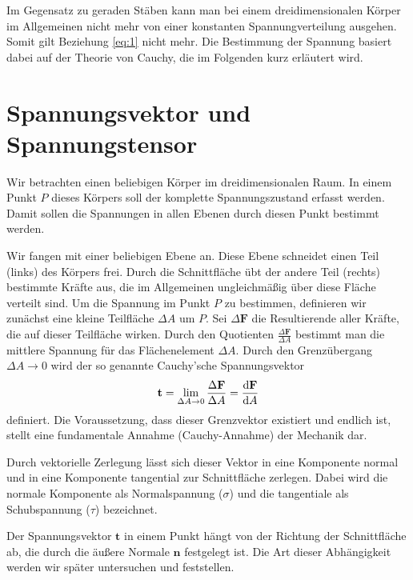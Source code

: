 \documentclass{lecture}
\begin{document}
    Im Gegensatz zu geraden Stäben kann man bei einem dreidimensionalen Körper im Allgemeinen nicht mehr von einer konstanten Spannungverteilung ausgehen.
    Somit gilt Beziehung \eqref{eq:1} nicht mehr.
    Die Bestimmung der Spannung basiert dabei auf der Theorie von Cauchy, die im Folgenden kurz erläutert wird.


    \section*{Spannungsvektor und Spannungstensor}

    Wir betrachten einen beliebigen Körper im dreidimensionalen Raum.
    In einem Punkt \(P\) dieses Körpers soll der komplette Spannungszustand erfasst werden.
    Damit sollen die Spannungen in allen Ebenen durch diesen Punkt bestimmt werden.


    Wir fangen mit einer beliebigen Ebene an.
    Diese Ebene schneidet einen Teil (links) des Körpers frei.
    Durch die Schnittfläche übt der andere Teil (rechts) bestimmte Kräfte aus, die im Allgemeinen ungleichmäßig über diese Fläche verteilt sind.
    Um die Spannung im Punkt \(P\) zu bestimmen, definieren wir zunächst eine kleine Teilfläche \(\Delta A\) um \(P\).
    Sei \(\Delta\mathbf{F}\) die Resultierende aller Kräfte, die auf dieser Teilfläche wirken.
    Durch den Quotienten \(\frac{\Delta\mathbf{F}}{\Delta A}\) bestimmt man die mittlere Spannung für das Flächenelement \(\Delta A\).
    Durch den Grenzübergang \(\Delta A \to 0\) wird der so genannte Cauchy'sche Spannungsvektor
    \begin{equation}\label{eq:2}
        \mathbf{t} = \lim_{\Delta A \to 0}\frac{\Delta\mathbf{F}}{\Delta A} = \frac{\mathop{\mathrm{d}\!}\mathbf{F}}{\mathop{\mathrm{d}\!} A}
    \end{equation}
    definiert.
    Die Voraussetzung, dass dieser Grenzvektor existiert und endlich ist, stellt eine fundamentale Annahme (Cauchy-Annahme) der Mechanik dar.

    Durch vektorielle Zerlegung lässt sich dieser Vektor in eine Komponente normal und in eine Komponente tangential zur Schnittfläche zerlegen.
    Dabei wird die normale Komponente als Normalspannung (\(\sigma\)) und die tangentiale als Schubspannung (\(\tau\)) bezeichnet.

    Der Spannungsvektor \(\mathbf{t}\) in einem Punkt hängt von der Richtung der Schnittfläche ab, die durch die äußere Normale \(\mathbf{n}\) festgelegt ist.
    Die Art dieser Abhängigkeit werden wir später untersuchen und feststellen.
\end{document}
